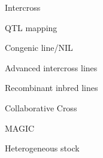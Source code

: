 \documentclass[aspectratio=169,12pt,t]{beamer}
\begin{document}
\begin{frame}[c]{Intercross}

\note{
}

\end{frame}





\begin{frame}[c]{QTL mapping}

\vspace{5mm}

\note{
}

\end{frame}


\begin{frame}[c]{Congenic line/NIL}


\note{
}

\end{frame}




\begin{frame}[c]{Advanced intercross lines}


\note{
}

\end{frame}


\begin{frame}[c]{Recombinant inbred lines}


\note{
}

\end{frame}


\begin{frame}[c]{Collaborative Cross}



\note{
}

\end{frame}


\begin{frame}[c]{MAGIC}



\note{
}

\end{frame}



\begin{frame}[c]{Heterogeneous stock}

  \vspace{2mm}



\note{
}

\end{frame}
\end{document}
